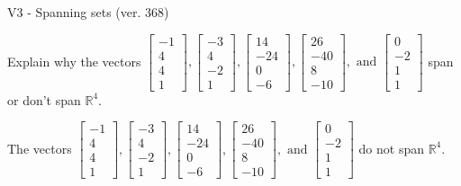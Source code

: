 \begin{exercise}
  \begin{exerciseTitle}V3 - Spanning sets (ver. 368)\end{exerciseTitle}
  \begin{exerciseStatement}
    Explain why the vectors \(\left[\begin{array}{r}
-1 \\
4 \\
4 \\
1
\end{array}\right] , \left[\begin{array}{r}
-3 \\
4 \\
-2 \\
1
\end{array}\right] , \left[\begin{array}{r}
14 \\
-24 \\
0 \\
-6
\end{array}\right] , \left[\begin{array}{r}
26 \\
-40 \\
8 \\
-10
\end{array}\right] , \text{ and } \left[\begin{array}{r}
0 \\
-2 \\
1 \\
1
\end{array}\right]\) span or don't span \(\mathbb{R}^4\). 
	


  \end{exerciseStatement}
  \begin{exerciseAnswer}
   The vectors \(\left[\begin{array}{r}
-1 \\
4 \\
4 \\
1
\end{array}\right] , \left[\begin{array}{r}
-3 \\
4 \\
-2 \\
1
\end{array}\right] , \left[\begin{array}{r}
14 \\
-24 \\
0 \\
-6
\end{array}\right] , \left[\begin{array}{r}
26 \\
-40 \\
8 \\
-10
\end{array}\right] , \text{ and } \left[\begin{array}{r}
0 \\
-2 \\
1 \\
1
\end{array}\right]\) 
  	 do not  
	span \(\mathbb{R}^4\).
  



\end{exerciseAnswer}
\end{exercise}
